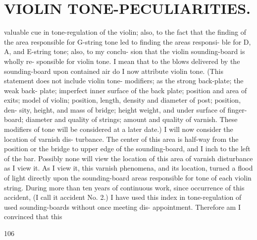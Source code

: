 \documentclass{article}
\begin{document}
\section*{VIOLIN TONE-PECULIARITIES.}
valuable cue in tone-regulation of the violin; also, to the fact that the finding of the area responsible for G-string tone led to finding the areas responsi- ble for D, A, and E-string tone; also, to my conclu- sion that the violin sounding-board is wholly re- sponsible for violin tone. I mean that to the blows delivered by the sounding-board upon contained air do I now attribute violin tone. (This statement does not include violin tone- modifiers; as the strong back-plate; the weak back- plate; imperfect inner surface of the back plate; position and area of exits; model of violin; position, length, density and diameter of post; position, den- sity, height, and mass of bridge; height weight, and under surface of finger-board; diameter and quality of strings; amount and quality of varnish. These modifiers of tone will be considered at a later date.) I will now consider the location of varnish dis- turbance. The center of this area is half-way from the position or the bridge to upper edge of the sounding-board, and I inch to the left of the bar. Possibly none will view the location of this area of varnish disturbance as I view it. As I view it, this varnish phenomena, and its location, turned a flood of light directly upon the sounding-board areas responsible for tone of each violin string. During more than ten years of continuous work, since occurrence of this accident, (I call it accident No. 2.) I have used this index in tone-regulation of used sounding-boards without once meeting dis- appointment. Therefore am I convinced that this

106
\end{document}
